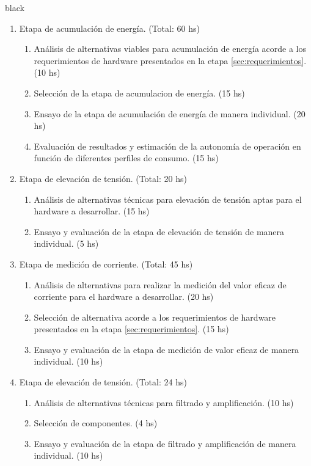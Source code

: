 \documentclass[11pt]{charter}
\begin{document}
\begin{consigna}{black}
\begin{enumerate}
\begin{enumerate}
			 \item Etapa de acumulación de energía. (Total: 60 hs)
			 \begin{enumerate}
			 	\item Análisis de alternativas viables para acumulación de energía acorde a los requerimientos de hardware presentados en la etapa \ref{sec:requerimientos}. (10 hs)
			 	\item Selección de la etapa de acumulacion de energía. (15 hs)
			 	\item Ensayo de la etapa de acumulación de energía de manera individual. (20 hs)
			 	\item Evaluación de resultados y estimación de la autonomía de operación en función de diferentes perfiles de consumo. (15 hs)
			 \end{enumerate}
			 
			 \item Etapa de elevación de tensión. (Total: 20 hs)
			 \begin{enumerate}
			 	\item Análisis de alternativas técnicas para elevación de tensión aptas para el hardware a desarrollar. (15 hs)
			 	\item Ensayo y evaluación de la etapa de elevación de tensión de manera individual. (5 hs)
			 \end{enumerate}

			 \item Etapa de medición de corriente. (Total: 45 hs)
			 \begin{enumerate}
			 	\item Análisis de alternativas para realizar la medición del valor eficaz de corriente para el hardware a desarrollar. (20 hs)
			 	\item Selección de alternativa acorde a los requerimientos de hardware presentados en la etapa \ref{sec:requerimientos}. (15 hs)
			 	\item Ensayo y evaluación de la etapa de medición de valor eficaz de manera individual. (10 hs)
			 \end{enumerate}
			 
			 \item Etapa de elevación de tensión. (Total: 24 hs)
			 \begin{enumerate}
			 	\item Análisis de alternativas técnicas para filtrado y amplificación. (10 hs)
			 	\item Selección de componentes. (4 hs)
			 	\item Ensayo y evaluación de la etapa de filtrado y amplificación de manera individual. (10 hs)
			 \end{enumerate}
			 

\end{enumerate}
\end{enumerate}
\end{consigna}
\end{document}
